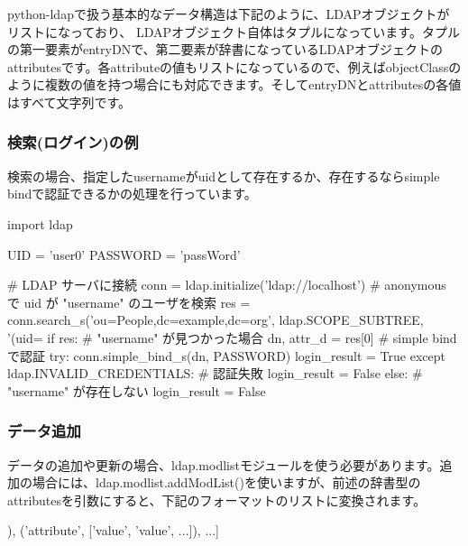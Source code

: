 \documentclass[mingoth,a4paper]{jsarticle}
\begin{document}

python-ldapで扱う基本的なデータ構造は下記のように、LDAPオブジェクトがリストになっており、
LDAPオブジェクト自体はタプルになっています。タプルの第一要素がentryDNで、第二要素が辞書になっているLDAPオブジェクトのattributesです。各attributeの値もリストになっているので、例えばobjectClassのように複数の値を持つ場合にも対応できます。そしてentryDNとattributesの各値はすべて文字列です。

\begin{commandline}
\end{commandline}

\subsubsection{検索(ログイン)の例}
検索の場合、指定したusernameがuidとして存在するか、存在するならsimple bindで認証できるかの処理を行っています。
\begin{commandline}
import ldap

UID = 'user0'
PASSWORD = 'passWord'

# LDAP サーバに接続
conn = ldap.initialize('ldap://localhost')
# anonymous で uid が "username" のユーザを検索
res = conn.search_s('ou=People,dc=example,dc=org', ldap.SCOPE_SUBTREE,
                    '(uid=%
if res:
    # "username" が見つかった場合
    dn, attr_d = res[0]
    # simple bind で認証
    try:
        conn.simple_bind_s(dn, PASSWORD)
        login_result = True
    except ldap.INVALID_CREDENTIALS:
        # 認証失敗
        login_result = False
else:
    # "username" が存在しない
    login_result = False
\end{commandline}

\subsubsection{データ追加}

データの追加や更新の場合、ldap.modlistモジュールを使う必要があります。追加の場合には、ldap.modlist.addModList()を使いますが、前述の辞書型のattributesを引数にすると、下記のフォーマットのリストに変換されます。
\begin{commandline}
[('attribute', ['value']),
 ('attribute', ['value', 'value', ...]), ...]
\end{commandline}
\end{document}
